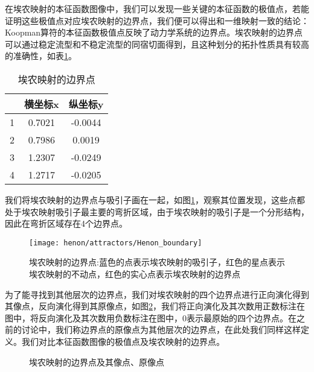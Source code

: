 在埃农映射的本征函数图像中，我们可以发现一些关键的本征函数的极值点，若能证明这些极值点对应埃农映射的边界点，我们便可以得出和一维映射一致的结论：Koopman算符的本征函数极值点反映了动力学系统的边界点。埃农映射的边界点可以通过稳定流型和不稳定流型的同宿切面得到\cite{d1990topology,giovannini1992generating,grassberger1989symbolic}，且这种划分的拓扑性质具有较高的准确性\cite{d1990topology}，如表\ref{tab:henon_boundary}。
\begin{table}[]
    \centering
    \begin{tabular}{|c|c|c|}
    \hline
        & 横坐标x & 纵坐标y  \\ \hline
    1   & 0.7021 & -0.0044 \\ \hline
    2   & 0.7986 & 0.0019  \\ \hline
    3   & 1.2307 & -0.0249 \\ \hline
    4   & 1.2717 & -0.0205 \\ \hline
    \end{tabular}
    \caption{埃农映射的边界点}\label{tab:henon_boundary}
\end{table}
我们将埃农映射的边界点与吸引子画在一起，如图\ref{fig:henon_boundary}，观察其位置发现，这些点都处于埃农映射吸引子最主要的弯折区域，由于埃农映射的吸引子是一个分形结构，因此在弯折区域存在4个边界点。
\begin{figure}
	\centering
	\texttt{[image: henon/attractors/Henon\_boundary]}
    \caption[埃农映射的边界点]{埃农映射的边界点:蓝色的点表示埃农映射的吸引子，红色的星点表示埃农映射的不动点，红色的实心点表示埃农映射的边界点}\label{fig:henon_boundary}
\end{figure}
为了能寻找到其他层次的边界点，我们对埃农映射的四个边界点进行正向演化得到其像点，反向演化得到其原像点，如图\ref{fig:Henon_boundary_forward}，我们将正向演化及其次数用正数标注在图中，将反向演化及其次数用负数标注在图中，$0$表示最原始的四个边界点。在之前的讨论中，我们称边界点的原像点为其他层次的边界点，在此处我们同样这样定义。我们对比本征函数图像的极值点及埃农映射的边界点。
\begin{figure}
    \centering
    \caption{埃农映射的边界点及其像点、原像点}\label{fig:Henon_boundary_forward}
\end{figure}

